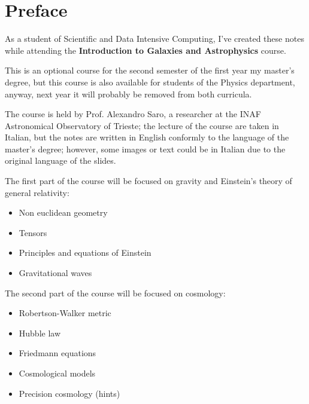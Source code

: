 \chapter*{Preface}

As a student of Scientific and Data Intensive Computing, I've created these notes while attending the \textbf{Introduction to Galaxies and Astrophysics} course.

This is an optional course for the second semester of the first year my master's degree, but this course is also available for students of the Physics department, anyway, next year it will probably be removed from both curricula. 

The course is held by Prof. Alexandro Saro, a researcher at the INAF Astronomical Observatory of Trieste; the lecture of the course are taken in Italian, but the notes are written in English conformly to the language of the master's degree; however, some images or text could be in Italian due to the original language of the slides.

\vspace{0.5em}

The first part of the course will be focused on gravity and Einstein's theory of general relativity:

\begin{itemize}
    \item Non euclidean geometry
    \item Tensors
    \item Principles and equations of Einstein
    \item Gravitational waves
\end{itemize}

\vspace{0.5em}

The second part of the course will be focused on cosmology:

\begin{itemize}
    \item Robertson-Walker metric
    \item Hubble law
    \item Friedmann equations
    \item Cosmological models
    \item Precision cosmology (hints)
\end{itemize}